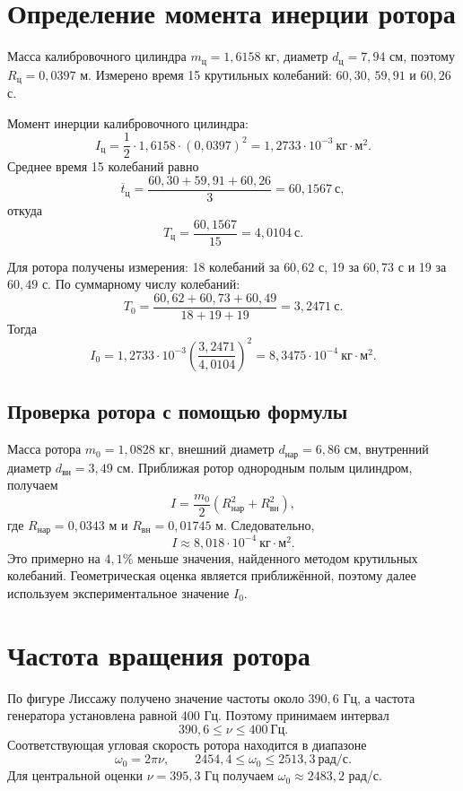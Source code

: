 \documentclass[12pt,a4paper]{article}
\begin{document}
\section{Определение момента инерции ротора}

Масса калибровочного цилиндра $m_{\text{ц}}=1{,}6158$ кг, диаметр $d_{\text{ц}}=7{,}94$ см, поэтому $R_{\text{ц}}=0{,}0397$ м. Измерено время 15 крутильных колебаний: $60{,}30$, $59{,}91$ и $60{,}26$ с.

Момент инерции калибровочного цилиндра:
\[
I_{\text{ц}}=\frac{1}{2}\cdot1{,}6158\cdot(0{,}0397)^2
=1{,}2733\cdot10^{-3}\ \text{кг}\cdot\text{м}^2.
\]
Среднее время 15 колебаний равно
\[
\overline t_{\text{ц}}=\frac{60{,}30+59{,}91+60{,}26}{3}
=60{,}1567\ \text{с},
\]
откуда
\[
T_{\text{ц}}=\frac{60{,}1567}{15}=4{,}0104\ \text{с}.
\]

Для ротора получены измерения: 18 колебаний за $60{,}62$ с, 19 за $60{,}73$ с и 19 за $60{,}49$ с. По суммарному числу колебаний:
\[
T_0=\frac{60{,}62+60{,}73+60{,}49}{18+19+19}
=3{,}2471\ \text{с}.
\]
Тогда
\[
I_0=1{,}2733\cdot10^{-3}
\left(\frac{3{,}2471}{4{,}0104}\right)^2
=8{,}3475\cdot10^{-4}\ \text{кг}\cdot\text{м}^2.
\]

\subsection*{Проверка ротора с помощью формулы}
Масса ротора $m_0=1{,}0828$ кг, внешний диаметр $d_{\text{нар}}=6{,}86$ см, внутренний диаметр $d_{\text{вн}}=3{,}49$ см. Приближая ротор однородным полым цилиндром, получаем
\[
I=\frac{m_0}{2}
\left(R_{\text{нар}}^2+R_{\text{вн}}^2\right),
\]
где $R_{\text{нар}}=0{,}0343$ м и $R_{\text{вн}}=0{,}01745$ м. Следовательно,
\[
I\approx8{,}018\cdot10^{-4}\ \text{кг}\cdot\text{м}^2.
\]
Это примерно на $4{,}1\%$ меньше значения, найденного методом крутильных колебаний. Геометрическая оценка является приближённой, поэтому далее используем экспериментальное значение $I_0$.

\section{Частота вращения ротора}

По фигуре Лиссажу получено значение частоты около $390{,}6$ Гц, а частота генератора установлена равной $400$ Гц. Поэтому принимаем интервал
\[
390{,}6\leq \nu\leq400\ \text{Гц}.
\]
Соответствующая угловая скорость ротора находится в диапазоне
\[
\omega_0=2\pi \nu,\qquad
2454{,}4\leq\omega_0\leq2513{,}3\ \text{рад/с}.
\]
Для центральной оценки $\nu=395{,}3$ Гц получаем $\omega_0\approx2483{,}2$ рад/с.
\end{document}
